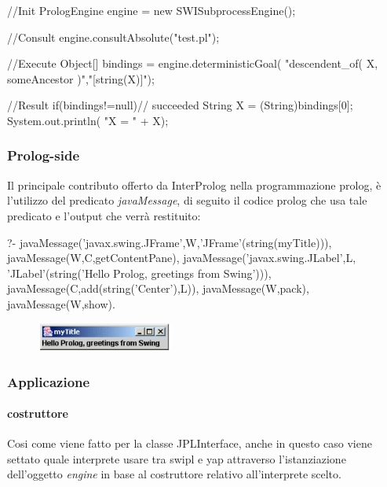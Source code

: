 \begin{javacode}
 //Init
  PrologEngine engine = new SWISubprocessEngine();
    
 //Consult
  engine.consultAbsolute("test.pl");
    
 //Execute
  Object[] bindings = engine.deterministicGoal(
                       "descendent_of( X, someAncestor )","[string(X)]");
    
 //Result
  if(bindings!=null){// succeeded
      String X = (String)bindings[0];
      System.out.println( "X = " + X);
  }
\end{javacode}

\subsubsection*{Prolog-side}
Il principale contributo offerto da InterProlog nella programmazione prolog, è l'utilizzo del predicato \emph{javaMessage}, di seguito il codice prolog che usa tale predicato e l'output che verrà restituito:

\begin{prologcode}
?- javaMessage('javax.swing.JFrame',W,'JFrame'(string(myTitle))),
   javaMessage(W,C,getContentPane),
   javaMessage('javax.swing.JLabel',L,
            'JLabel'(string('Hello Prolog, greetings from Swing'))),
   javaMessage(C,add(string('Center'),L)),
   javaMessage(W,pack), javaMessage(W,show).
\end{prologcode}

\begin{figure}[H]
	\centering
	\includegraphics[width=0.4\textwidth]{img/javaMessageInterProlog.png}
\end{figure}

\subsubsection{Applicazione}
\paragraph{costruttore}
Cosi come viene fatto per la classe JPLInterface, anche in questo caso viene settato quale interprete usare tra swipl e yap attraverso l'istanziazione dell'oggetto \emph{engine} in base al costruttore relativo all'interprete scelto.

